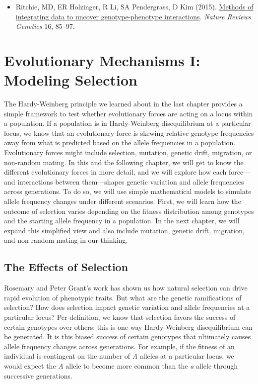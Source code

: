 \documentclass[
]{book}
\providecommand{\tightlist}{%
  \setlength{\itemsep}{0pt}\setlength{\parskip}{0pt}}
\begin{document}
\begin{itemize}
\tightlist
\item
  Ritchie, MD, ER Holzinger, R Li, SA Pendergrass, D Kim (2015). \href{https://www.nature.com/articles/nrg3868}{Methods of integrating data to uncover genotype-phenotype interactions}. \emph{Nature Reviews Genetics} 16, 85--97.
\end{itemize}

\hypertarget{evolutionary-mechanisms-i-modeling-selection}{%
\chapter{Evolutionary Mechanisms I: Modeling Selection}\label{evolutionary-mechanisms-i-modeling-selection}}

The Hardy-Weinberg principle we learned about in the last chapter provides a simple framework to test whether evolutionary forces are acting on a locus within a population. If a population is in Hardy-Weinberg disequilibrium at a particular locus, we know that an evolutionary force is skewing relative genotype frequencies away from what is predicted based on the allele frequencies in a population. Evolutionary forces might include selection, mutation, genetic drift, migration, or non-random mating. In this and the following chapter, we will get to know the different evolutionary forces in more detail, and we will explore how each force---and interactions between them---shapes genetic variation and allele frequencies across generations. To do so, we will use simple mathematical models to simulate allele frequency changes under different scenarios. First, we will learn how the outcome of selection varies depending on the fitness distribution among genotypes and the starting allele frequency in a population. In the next chapter, we will expand this simplified view and also include mutation, genetic drift, migration, and non-random mating in our thinking.

\hypertarget{the-effects-of-selection}{%
\section{The Effects of Selection}\label{the-effects-of-selection}}

Rosemary and Peter Grant's work has shown us how natural selection can drive rapid evolution of phenotypic traits. But what are the genetic ramifications of selection? How does selection impact genetic variation and allele frequencies at a particular locus? Per definition, we know that selection favors the success of certain genotypes over others; this is one way Hardy-Weinberg disequilibrium can be generated. It is this biased success of certain genotypes that ultimately causes allele frequency changes across generations. For example, if the fitness of an individual is contingent on the number of \emph{A} alleles at a particular locus, we would expect the \emph{A} allele to become more common than the \emph{a} allele through successive generations.
\end{document}
